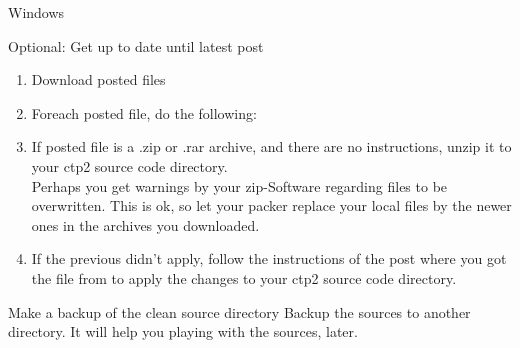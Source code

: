 \begin{section}{Windows}
\begin{subsection}{Optional: Get up to date until latest post}
\begin{enumerate}
\item{Download posted files}
\item{Foreach posted file, do the following:}
\item{If posted file is a .zip or .rar archive, and there are no instructions, unzip it to your ctp2 source code directory.\\
Perhaps you get warnings by your zip-Software regarding files to be overwritten. This is ok, so let your packer replace your local files by the newer ones in the archives you downloaded.}
\item{If the previous didn't apply, follow the instructions of the post where you got the file from to apply the changes to your ctp2 source code directory.}
\end{enumerate}
\end{subsection}%

\begin{subsection}{Make a backup of the clean source directory}
Backup the sources to another directory. It will help you playing with the sources, later.
\end{subsection}%

\end{section}%
